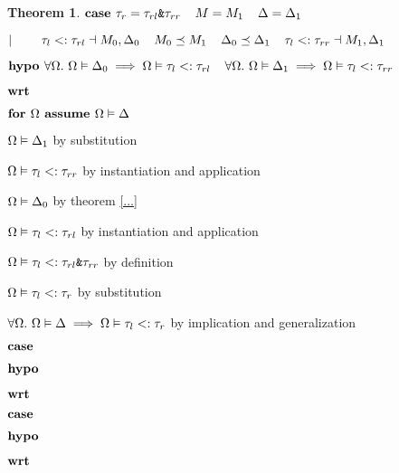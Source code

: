 \documentclass[acmsmall]{acmart}
\theoremstyle{definition}
\newtheorem{theorem}{Theorem}[section]
\begin{document}
\begin{theorem}
    \item \Z $\textbf{case } 
      \tau_r = \texttt{$\tau_{rl}$\&$\tau_{rr}$}
      \hspace{4mm}
      M = M_1
      \hspace{4mm}
      \Delta = \Delta_1
    $
    \item \Z $|\ \ \ \ \ \ \  
      \tau_l <: \tau_{rl} \dashv M_0, \Delta_0
      \hspace{4mm}
      M_0 \preceq M_1
      \hspace{4mm}
      \Delta_0 \preceq \Delta_1
      \hspace{4mm}
      \tau_l <: \tau_{rr} \dashv M_1, \Delta_1
    $
    \item \Z $\textbf{hypo } 
      \forall \Omega .\ \Omega \vDash \Delta_0 \implies \Omega \vDash \tau_l <: \tau_{rl} 
      \hspace{4mm}
      \forall \Omega .\ \Omega \vDash \Delta_1 \implies \Omega \vDash \tau_l <: \tau_{rr} 
    $
    \item \Z $\textbf{wrt } $
      \item \Z\Z $\textbf{for } \Omega \textbf{ assume } \Omega \vDash \Delta$
        \item \Z\Z\Z $\Omega \vDash \Delta_1 $ by substitution
        \item \Z\Z\Z $\Omega \vDash \tau_l <: \tau_{rr}$ by instantiation and application 
        \item \Z\Z\Z $\Omega \vDash \Delta_0 $ by theorem \ref{...}  
        \item \Z\Z\Z $\Omega \vDash \tau_l <: \tau_{rl}$ by instantiation and application 
        \item \Z\Z\Z $\Omega \vDash \tau_l <: \texttt{$\tau_{rl}$\&$\tau_{rr}$}$ by definition 
        \item \Z\Z\Z $\Omega \vDash \tau_l <: \tau_r$ by substitution
      \item \Z\Z $\forall \Omega .\ \Omega \vDash \Delta \implies \Omega \vDash \tau_l <: \tau_r$ 
      by implication and generalization


    \item \Z $\textbf{case } $
    \item \Z $\textbf{hypo } $
    \item \Z $\textbf{wrt } $
      \item \Z\Z {} 

    \item \Z $\textbf{case } $
    \item \Z $\textbf{hypo } $
    \item \Z $\textbf{wrt } $
      \item \Z\Z {} 


\end{theorem}
\end{document}
